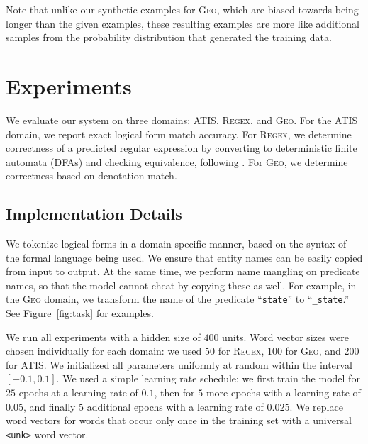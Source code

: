 \documentclass[11pt,letterpaper]{article}
\newcommand{\atis}{\textsc{ATIS}\xspace}
\newcommand{\regex}{\textsc{Regex}\xspace}
\newcommand{\geo}{\textsc{Geo}\xspace}
\newcommand\pl[1]{\textcolor{red}{[PL: #1]}}
\newcommand\rj[1]{\textcolor{blue}{[RJ: #1]}}
\begin{document}
Note that unlike our synthetic examples for \geo, which are biased
towards being longer than the given examples, these resulting examples
are more like additional samples from the probability distribution
that generated the training data.

%

\section{Experiments}
We evaluate our system on three domains: \atis, \regex, and \geo.
For the \atis domain, we report exact logical form match accuracy.
For \regex, we determine correctness of a predicted regular expression
by converting to deterministic finite automata (DFAs)
and checking equivalence, following .
For \geo, we determine correctness based on denotation match.

\subsection{Implementation Details}
We tokenize logical forms in a domain-specific manner,
based on the syntax of the formal language being used.
We ensure that entity names can be easily copied from input to output.
At the same time, we perform name mangling on predicate names,
so that the model cannot cheat by copying these as well.
For example, in the \geo domain, we transform the name
of the predicate ``\texttt{state}'' to ``\texttt{\_state}.''
See Figure~\ref{fig:task} for examples.

We run all experiments with a hidden size of $400$ units.
Word vector sizes were chosen individually for each domain:
we used $50$ for \regex, $100$ for \geo, and $200$ for \atis.
We initialized all parameters uniformly at random 
within the interval $[-0.1, 0.1]$.
We used a simple learning rate schedule:
we first train the model for $25$ epochs at a learning rate of $0.1$,
then for $5$ more epochs with a learning rate of $0.05$,
and finally $5$ additional epochs with a learning rate of $0.025$.
We replace word vectors for words that occur only once in the training set 
with a universal \texttt{<unk>} word vector.
\end{document}
